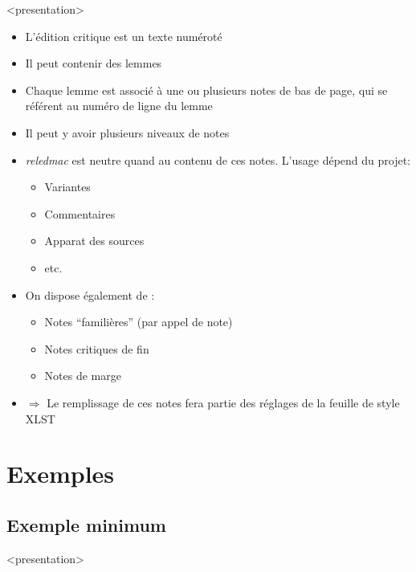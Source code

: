 \documentclass[transnotheorems,noamsthm]{beamer}
\newenvironment{slide}{%
  \begin{frame}
  <presentation>\mode<presentation>{\frametitle{\insertsubsection}}%
  }%
  {\end{frame}}
\newcounter{code}
\newcommand{\package}[1]{\emph{#1}}
\begin{document}
\begin{slide}
  \begin{itemize}
    \item L'édition critique est un \alert{texte numéroté}
    \item Il peut contenir des \alert{lemmes}
    \item Chaque lemme est associé à une ou plusieurs \alert{notes de bas de page}, qui se référent au numéro de ligne du lemme
    \item Il peut y avoir plusieurs niveaux de notes
    \item \package{reledmac} est \alert{neutre} quand au contenu de ces  notes. L'usage dépend du projet:
        \begin{itemize}
          \item Variantes
          \item Commentaires
          \item Apparat des sources
          \item etc.
        \end{itemize}
    \item  On dispose également de :
      \begin{itemize}
        \item Notes \enquote{familières} (par appel de note)
        \item Notes critiques de fin
        \item Notes de marge
      \end{itemize}
    \item \alert{$\Longrightarrow$} Le remplissage de ces notes fera partie des réglages de la feuille de style XLST
  \end{itemize}
\end{slide}

\section{Exemples}

\subsection{Exemple minimum}

\begin{slide}
  \begin{minipage}{0.8\textwidth}
    
  \end{minipage}
\end{slide}
\end{document}
